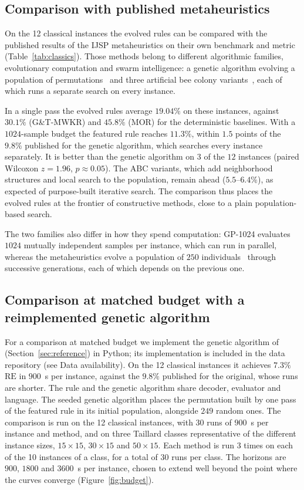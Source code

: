 \documentclass[review,authoryear,11pt]{elsarticle}
\newcommand{\RE}{\mathrm{RE}}
\begin{document}
\subsection{Comparison with published metaheuristics}
\label{sec:metaheur}
On the 12 classical instances the evolved rules can be compared with the
published results of the IJSP metaheuristics on their own benchmark and
metric (Table~\ref{tab:classics}). Those methods belong to different
algorithmic families, evolutionary computation and swarm intelligence:
a genetic algorithm evolving a population of
permutations~\citep{DiazGA2020} and three artificial bee colony
variants~\citep{DiazABC2022,DiazFEABC2023,DiazICAE2023}, each of which runs a
separate search on every instance.

In a single pass the evolved rules average $19.04\%$ on these
instances, against $30.1\%$ (G\&T-MWKR) and $45.8\%$ (MOR) for the
deterministic baselines. With a $1024$-sample budget the featured rule
reaches $11.3\%$, within $1.5$ points of the $9.8\%$ published for the
genetic algorithm, which searches every instance separately. It is
better than the genetic algorithm on $3$ of the $12$ instances (paired
Wilcoxon $z = 1.96$, $p \approx 0.05$). The ABC variants, which add neighborhood structures
and local search to the population, remain ahead ($5.5$--$6.4\%$), as
expected of purpose-built iterative search. The comparison thus places
the evolved rules at the frontier of constructive methods, close to a
plain population-based search.

The two families also differ in how they spend computation:
GP-1024 evaluates $1024$ mutually independent samples per instance,
which can run in parallel, whereas the metaheuristics evolve a
population of $250$ individuals~\citep{DiazGA2020,DiazFEABC2023} through
successive generations, each of which depends on the previous one.

\subsection{Comparison at matched budget with a reimplemented genetic
algorithm}
\label{sec:budget}
For a comparison at matched budget we implement the genetic algorithm of
\citet{DiazGA2020} (Section~\ref{sec:reference}) in Python; its
implementation is included in the data repository (see Data
availability). On the 12
classical instances it achieves $7.3\%$ $\RE$ in $900$~s per instance,
against the $9.8\%$ published for the original, whose runs are
shorter. The rule and the genetic
algorithm share decoder, evaluator and language. The seeded genetic
algorithm places the permutation built by one pass of the featured rule
in its initial population, alongside $249$ random ones. The comparison is run
on the 12 classical instances, with 30 runs of $900$~s per instance and
method, and on three Taillard classes representative of the different
instance sizes, $15{\times}15$, $30{\times}15$ and $50{\times}15$. Each method is run 3 times on each of
the 10 instances of a class, for a total of 30 runs per class. The
horizons are $900$, $1800$ and $3600$~s per instance, chosen to extend
well beyond the point where the curves converge
(Figure~\ref{fig:budget}).
\end{document}
